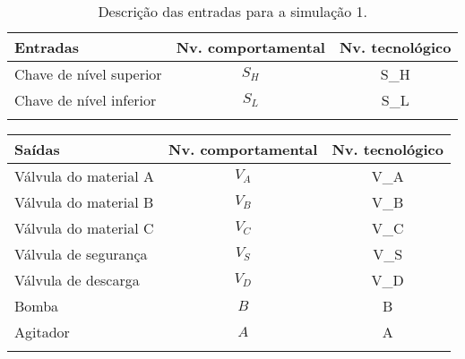 \begin{longtable}[]{@{}lcc@{}}
\toprule
Entradas & Nv. comportamental & Nv. tecnológico \\
\midrule
\endhead
Chave de nível superior & \(S_H\) & S\_H \\
Chave de nível inferior & \(S_L\) & S\_L \\
\bottomrule
\caption{Descrição das entradas para a simulação 1.}
\label{tbl:1}
\end{longtable}

\begin{longtable}[]{@{}lcc@{}}
\toprule
Saídas & Nv. comportamental & Nv. tecnológico \\
\midrule
\endhead
Válvula do material A & \(V_A\) & V\_A \\
Válvula do material B & \(V_B\) & V\_B \\
Válvula do material C & \(V_C\) & V\_C \\
Válvula de segurança & \(V_S\) & V\_S \\
Válvula de descarga & \(V_D\) & V\_D \\
Bomba & \(B\) & B \\
Agitador & \(A\) & A \\
\bottomrule
\label{tbl:2}
\end{longtable}